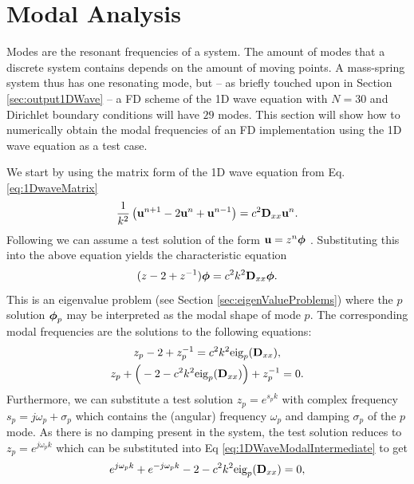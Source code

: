{{\section{Modal Analysis}
\label{sec:modalAnalysis}
Modes are the resonant frequencies of a system. The amount of modes that a discrete system contains depends on the amount of moving points. A mass-spring system thus has one resonating mode, but -- as briefly touched upon in Section \ref{sec:output1DWave} -- a FD scheme of the 1D wave equation with $N = 30$ and Dirichlet boundary conditions will have $29$ modes. This section will show how to numerically obtain the modal frequencies of an FD implementation using the 1D wave equation as a test case. 

We start by using the matrix form of the 1D wave equation from Eq. \eqref{eq:1DwaveMatrix}
\begin{equation*}
    \frac{1}{k^2}\left(\mathbf{u}^{n+1}-2\mathbf{u}^n+\mathbf{u}^{n-1}\right) = c^2 \mathbf{D}_{xx}\mathbf{u}^n.
\end{equation*}
Following \cite{theBible} we can assume a test solution of the form $\mathbf{u} = z^n\boldsymbol{\phi}$ . Substituting this into the above equation yields the characteristic equation
\begin{equation}
    (z - 2 + z^{-1})\boldsymbol{\phi} = c^2k^2\mathbf{D}_{xx} \boldsymbol{\phi}.
\end{equation}
This is an eigenvalue problem (see Section \ref{sec:eigenValueProblems}) where the $p$\th solution $\boldsymbol{\phi}_p$ may be interpreted as the modal shape of mode $p$. The corresponding modal frequencies are the solutions to the following equations:
\begin{gather}\label{eq:1DWaveModalIntermediate}
    z_p-2+z_p^{-1} = c^2k^2\text{eig}_p(\mathbf{D}_{xx}),\nonumber\\
    z_p+\Big(-2-c^2k^2\text{eig}_p(\mathbf{D}_{xx})\Big)+z_p^{-1}=0.
\end{gather}
Furthermore, we can substitute a test solution $z_p = e^{s_pk}$ with complex frequency $s_p = j\omega_p + \sigma_p$ which contains the (angular) frequency $\omega_p$ and damping $\sigma_p$ of the $p$\th mode. As there is no damping present in the system, the test solution reduces to $z_p = e^{j\omega_p k}$ which can be substituted into Eq \eqref{eq:1DWaveModalIntermediate} to get
\begin{align*}
    e^{j\omega_pk}+e^{-j\omega_pk}-2-c^2k^2\text{eig}_p(\Dxx)&=0,\\

\end{align*}}}
